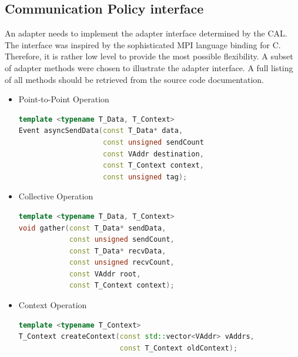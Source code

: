 \subsection{Communication Policy interface}
\label{sec:impl:policy_interface}
An adapter needs to implement the adapter interface determined by the
CAL.  The interface was inspired by the sophisticated MPI language
binding for C. Therefore, it is rather low level to provide the most
possible flexibility.  A subset of adapter methods were chosen to
illustrate the adapter interface. A full listing of all methods should
be retrieved from the source code documentation.

\begin{itemize}

  \item Point-to-Point Operation
    \begin{lstlisting}[language=C++, breaklines=false, label={}]
template <typename T_Data, T_Context>      
Event asyncSendData(const T_Data* data,      
                    const unsigned sendCount
                    const VAddr destination,
                    const T_Context context,
                    const unsigned tag); 
    \end{lstlisting}
    
  \item Collective Operation
    \begin{lstlisting}[language=C++, breaklines=false, label={}]
template <typename T_Data, T_Context>      
void gather(const T_Data* sendData,
            const unsigned sendCount,
            const T_Data* recvData,
            const unsigned recvCount,
            const VAddr root,
            const T_Context context);
    \end{lstlisting}

  \item Context Operation
    \begin{lstlisting}[language=C++, breaklines=false, label={}]
template <typename T_Context>      
T_Context createContext(const std::vector<VAddr> vAddrs,
                        const T_Context oldContext);
    \end{lstlisting}
  
\end{itemize}


